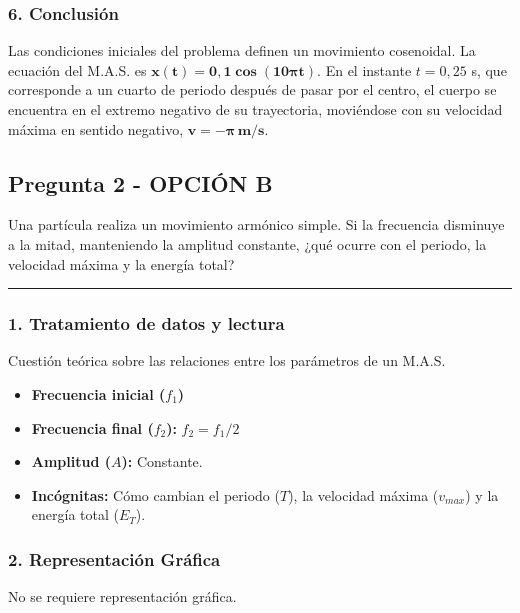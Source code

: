 \subsubsection*{6. Conclusión}
\begin{cajaconclusion}
Las condiciones iniciales del problema definen un movimiento cosenoidal. La ecuación del M.A.S. es $\mathbf{x(t) = 0,1 \cos(10\pi t)}$. En el instante $t=0,25$ s, que corresponde a un cuarto de periodo después de pasar por el centro, el cuerpo se encuentra en el extremo negativo de su trayectoria, moviéndose con su velocidad máxima en sentido negativo, $\mathbf{v = -\pi \, m/s}$.
\end{cajaconclusion}

\newpage

\subsection{Pregunta 2 - OPCIÓN B}
\label{subsec:2B_2003_jun_ord}

\begin{cajaenunciado}
Una partícula realiza un movimiento armónico simple. Si la frecuencia disminuye a la mitad, manteniendo la amplitud constante, ¿qué ocurre con el periodo, la velocidad máxima y la energía total?
\end{cajaenunciado}
\hrule

\subsubsection*{1. Tratamiento de datos y lectura}
Cuestión teórica sobre las relaciones entre los parámetros de un M.A.S.
\begin{itemize}
    \item \textbf{Frecuencia inicial ($f_1$)}
    \item \textbf{Frecuencia final ($f_2$):} $f_2 = f_1 / 2$
    \item \textbf{Amplitud ($A$):} Constante.
    \item \textbf{Incógnitas:} Cómo cambian el periodo ($T$), la velocidad máxima ($v_{max}$) y la energía total ($E_T$).
\end{itemize}

\subsubsection*{2. Representación Gráfica}
No se requiere representación gráfica.

